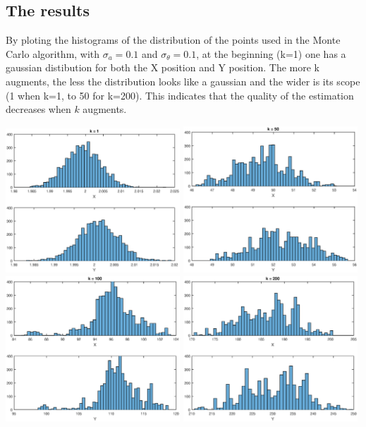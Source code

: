 \documentclass[english,DIV=13]{scrartcl}
\begin{document}
\subsection*{The results}
By ploting the histograms of the distribution of the points used in the Monte Carlo algorithm, 
with $\sigma_a=0.1$ and $\sigma_{\theta}=0.1$, at the beginning (k=1) one has a gaussian
distibution for both the X position and Y position. The more k augments, the less the
distribution looks like a gaussian and the wider is its scope (1 when k=1, to 50 for k=200).
This indicates that the quality of the estimation decreases when $k$ augments.

\begin{center}
   \includegraphics[width=0.49\textwidth]{img/q3_hist_1.eps}
   \includegraphics[width=0.49\textwidth]{img/q3_hist_50.eps}
   \includegraphics[width=0.49\textwidth]{img/q3_hist_100.eps}
   \includegraphics[width=0.49\textwidth]{img/q3_hist_200.eps}
\end{center}
\end{document}
